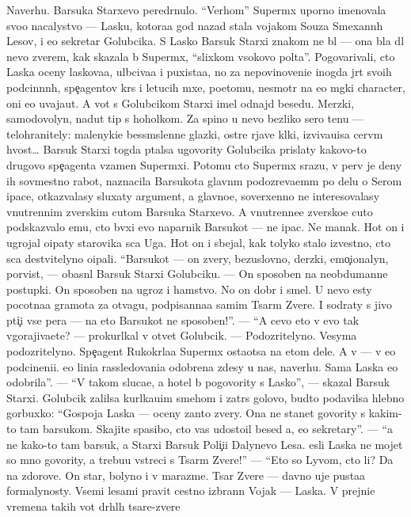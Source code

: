 \documentclass[12pt]{book}
\begin{document}
Naverhu. Barsuka Starxevo pered{\e}rnulo. ``Verhom'' Superm{\yi}x uporno ime\-no\-va\-la svo{\y}o nacalystvo — Lasku, kotora{\y}a god nazad stala vojakom So{\y}uza Smexann{\yi}h Lesov, i {\y}e{\y}o sekretar{\ia} Golubcika. S Lasko{\y} Barsuk Starxi{\y} znakom ne b{\yi}l — ona b{\yi}la dl{\ia} nevo zverem, kak skazala b{\yi} Superm{\yi}x, ``slixkom v{\yi}\-so\-ko\-vo pol{\e}ta''. Pogovarivali, cto Laska oceny laskova{\y}a, ul{\yi}bciva{\y}a i puxista{\y}a, no za nepovinoveni{\y}e inogda jr{\e}t svo{\y}ih podcin{\e}nn{\yi}h, spe{\c}agentov kr{\yi}s i letucih m{\yi}xe{\y}, poetomu, ne\-smo\-tr{\ia} na {\y}e{\y}o m{\ia}gki{\y} character, oni {\y}e{\y}o uvaja{\y}ut. A vot s Golubcikom Starxi{\y} imel od\-naj\-d{\yi} besedu. Merzki{\y}, samodovolyn{\yi}{\y}, nadut{\yi}{\y} tip s hoholkom. Za spino{\y} u nevo bezliko{\y} sero{\y} ten{\y}u — telohranitely: malenyki{\y}e bessm{\yi}slenn{\yi}{\y}e glazki, ostr{\yi}{\y}e rjav{\yi}{\y}e kl{\yi}ki, izviva{\y}u{\x}i{\y}sa cer\-v{\e}m hvost… Barsuk Starxi{\y} togda p{\yi}talsa ugovority Golubcika prislaty kakovo-to drugovo spe{\c}agenta vzamen Superm{\yi}xi. Potomu cto Superm{\yi}x srazu, v perv{\yi}{\y} je deny ih sovmestno{\y} rabot{\yi}, naznacila Barsukota glavn{\yi}m po\-do\-zre\-va\-{\y}e\-m{\yi}m po delu o Serom {\X}ipace, otkaz{\yi}valasy sluxaty argument{\yi}, a glavno{\y}e, soverxenno ne interesovalasy vnutrennim zverskim cut{\y}om Barsuka Starxevo. A vnutrenne{\y}e zversko{\y}e cut{\y}o podskaz{\yi}valo {\y}emu, cto b{\yi}vxi{\y} {\y}evo naparnik Barsukot — ne {\X}ipac. Ne man{\y}ak. Hot{\ia} on i ugrojal o{\x}ipaty star{\y}ov{\x}ika s{\yi}ca Uga. Hot{\ia} on i sbejal, kak tolyko stalo izvestno, cto s{\yi}ca de{\y}stvitelyno o{\x}ipali. ``Barsukot — on zvery, bezuslovno, derzki{\y}, emo{\c}ionalyn{\yi}{\y}, por{\yi}vist{\yi}{\y}, — ob{\y}asn{\ia}l Barsuk Starxi{\y} Golubciku. — On sposoben na neobdumann{\yi}{\y}e postupki. On sposoben na ugroz{\yi} i hamstvo. No on dobr{\yi}{\y} i smel{\yi}{\y}. U nevo {\y}esty pocotna{\y}a gramota za otvagu, podpisanna{\y}a samim Tsar{\e}m Zvere{\y}. I sodraty s jivo{\y} pti{\c}i vse per{\y}a — na eto Barsukot ne sposoben!''. — ``A cevo eto v{\yi} {\y}evo tak v{\yi}gorajiva{\y}ete? — prokurl{\yi}kal v otvet Golubcik. — Podozritelyno. Vesyma podozritelyno. Spe{\c}agent Rukokr{\yi}la{\y}a Superm{\yi}x osta{\y}otsa na etom dele. A v{\yi} — v {\y}e{\y}o podcineni{\y}i. {\Y}e{\y}o lini{\y}a rassledovani{\y}a odobrena zdesy u nas, naverhu. Sama Laska {\y}e{\y}o odobrila''. — ``V takom sluca{\y}e, {\y}a hotel b{\yi} po\-go\-vo\-rity s Lasko{\y}'', — skazal Barsuk Starxi{\y}. Golubcik zalilsa kurl{\yi}ka{\y}u{\x}im smehom i zatr{\ia}s go\-lo\-vo{\y}, budto podavilsa hlebno{\y} gorbuxko{\y}: ``Gospoja Laska — oceny zan{\ia}to{\y} zvery. Ona ne stanet govority s kakim-to tam barsukom. Skajite spasibo, cto vas udostoil besed{\yi} {\y}a, {\y}e{\y}o sekretary''. — ``{\Y}a ne kako{\y}-to tam barsuk, a Starxi{\y} Barsuk Poli{\c}i{\y}i Dalynevo Lesa. {\Y}esli Laska ne mojet so mno{\y} govority, {\y}a trebu{\y}u vstreci s Tsar{\e}m Zvere{\y}!'' — ``Eto so Lyvom, cto li? Da na zdorov{\y}e. On star{\yi}{\y}, bolyno{\y} i v marazme. Tsar Zvere{\y} — davno uje pusta{\y}a formalynosty. Vsemi lesami pravit cestno izbrann{\yi}{\y} Vojak — Laska. V prejni{\y}e vremena takih vot dr{\ia}hl{\yi}h tsare{\y}-zvere{\y} 
\end{document}
